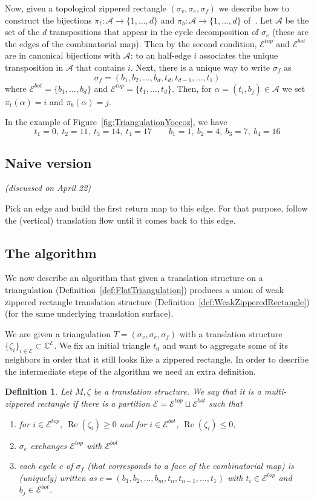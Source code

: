 \documentclass{article}
\def\CC{\mathbb{C}}
\def\cA{\mathcal{A}}
\def\cE{\mathcal{E}}
\def\Re{\operatorname{Re}}
\newtheorem{definition}{Definition}
\begin{document}
Now, given a topological zippered rectangle $(\sigma_v, \sigma_e, \sigma_f)$ we describe
how to construct the bijections $\pi_t:\cA \to \{1,\ldots,d\}$ and $\pi_b: \cA \to \{1,\ldots,d\}$ of~\cite{Yoccoz}.
Let $\cA$ be the set of the $d$ transpositions that appear in the cycle decomposition
of $\sigma_e$ (these are the edges of the combinatorial map). Then by the second
condition, $\cE^{top}$ and $\cE^{bot}$ are in canonical bijections with $\cA$: to an
half-edge $i$ associates the unique transposition in $\cA$ that contains $i$.
Next, there is a unique way to write $\sigma_f$ as
\[
\sigma_f = (b_1, b_2, \ldots, b_d, t_d, t_{d-1}, \ldots, t_1)
\]
where $\cE^{bot} = \{b_1, \ldots, b_d\}$ and $\cE^{top} = \{t_1, \ldots, t_d\}$.
Then, for $\alpha = (t_i, b_j) \in \cA$ we set $\pi_t(\alpha) = i$ and $\pi_b(\alpha) = j$.

In the example of Figure~\ref{fig:TriangulationYoccoz}, we have
\[
t_1 = 0,\ t_2 = 11,\ t_3 = 14,\ t_4 = 17
\qquad
b_1 = 1,\ b_2 = 4,\ b_3 = 7,\ b_4 = 16
\]

\subsection{Naive version}
\textit{(discussed on April 22)}

Pick an edge and build the first return map to this edge.
For that purpose, follow the (vertical) translation flow until it comes back to this edge.


\subsection{The algorithm}
We now describe an algorithm that given a translation structure on
a triangulation (Definition~\ref{def:FlatTriangulation}) produces a union
of weak zippered rectangle translation structure (Definition~\ref{def:WeakZipperedRectangle})
(for the same underlying translation surface).

We are given a triangulation $T = (\sigma_v, \sigma_e, \sigma_f)$ with a
translation structure $\{\zeta_i\}_{i \in \cE} \subset \CC^\cE$.
We fix an initial triangle $t_0$ and want to aggregate some of its neighbors
in order that it still looks like a zippered rectangle. In order to describe
the intermediate steps of the algorithm we need an extra definition.
\begin{definition}
Let $M,\zeta$ be a translation structure. We say that it is a
\emph{multi-zippered rectangle} if there is a partition $\cE = \cE^{top} \sqcup \cE^{bot}$
such that
\begin{enumerate}
\item for $i \in \cE^{top}$, $\Re(\zeta_i) \geq 0$ and for $i \in \cE^{bot}$, $\Re(\zeta_i) \leq 0$,
\item $\sigma_e$ exchanges $\cE^{top}$ with $\cE^{bot}$
\item each cycle $c$ of $\sigma_f$ (that corresponds to a face of the combinatorial map)
is (uniquely) written as $c = (b_1, b_2, \ldots, b_m, t_n, t_{n-1}, \ldots, t_1)$ with
$t_i \in \cE^{top}$ and $b_j \in \cE^{bot}$.
\end{enumerate}
\end{definition}
\end{document}
